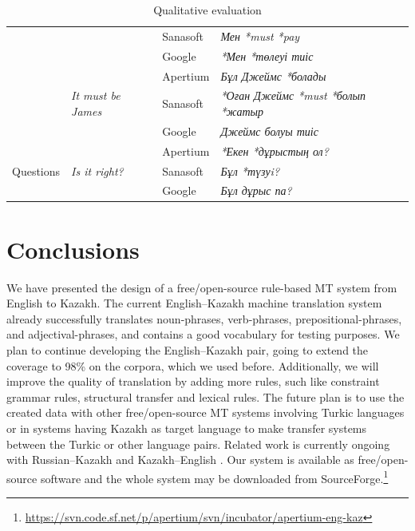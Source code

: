 \documentclass[11pt]{article}
\begin{document}
\begin{table}
\begin{tabular}{|l|l|l|l|}
                                  &                                         & Sanasoft & \emph{Мен *must *pay} \\ %
                                  &                                         & Google   & \emph{*Мен *төлеуі тиіс} \\ %
                                  & \multirow{3}{*}{\emph{It must be James}}       & Apertium & \emph{Бұл Джеймс *болады} \\ %
                                  &                                         & Sanasoft & \emph{*Оған Джеймс *must *болып *жатыр}  \\ %
                                  &                                         & Google   & \emph{Джеймс болуы тиіс} \\ %
    \hline 
    \multirow{3}{*}{Questions}    & \multirow{3}{*}{\emph{Is it right?}}           & Apertium & \emph{*Екен *дұрыстың ол?} \\ %
                                  &                                         & Sanasoft & \emph{Бұл *түзуi?} \\ %
                                  &                                         & Google   & \emph{Бұл дұрыс па?} \\
    \hline 
  \end{tabular}

  \caption{Qualitative evaluation}
  \label{table:qualeval}
\end{table}

\section{Conclusions}

We have presented the design of a free/open-source rule-based MT system from English to Kazakh. The current English--Kazakh machine translation 
system already successfully translates noun-phrases, verb-phrases, prepositional-phrases, and adjectival-phrases, and 
contains a good vocabulary for testing purposes. 
We plan to continue developing the English--Kazakh pair, going to extend the coverage to 98\% on the corpora, 
which we used before. Additionally, we will improve the quality of translation by adding more rules, such like 
constraint grammar rules, structural transfer and lexical rules. The future plan is to use the created data with other 
free/open-source MT systems involving Turkic languages or in systems having Kazakh as target language to make transfer systems 
between the Turkic or other language pairs. Related work is currently ongoing with Russian--Kazakh and Kazakh--English \citep{sundetova14}.
Our system is available as free/open-source software and the whole system may be downloaded 
from SourceForge.\footnote{\url{https://svn.code.sf.net/p/apertium/svn/incubator/apertium-eng-kaz}}
\end{document}
